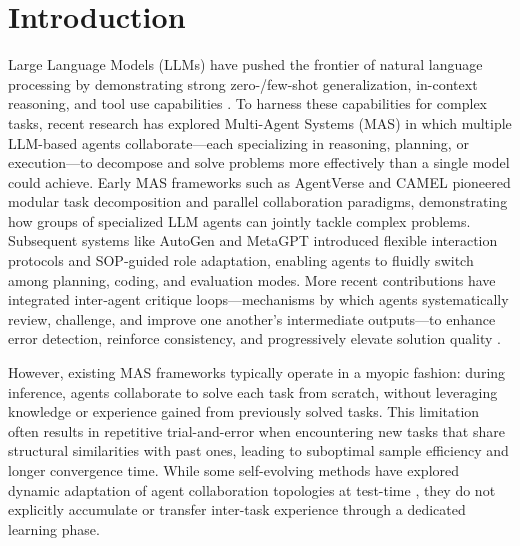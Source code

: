 \documentclass[preprint]{article}
\begin{document}
\section{Introduction}
Large Language Models (LLMs) have pushed the frontier of natural language processing by demonstrating strong zero-/few-shot generalization, in-context reasoning, and tool use capabilities \citep{vaswani2017attention,radford2019language,qin2023toolllm,schick2023toolformer}. 
To harness these capabilities for complex tasks, recent research has explored Multi-Agent Systems (MAS) in which multiple LLM-based agents collaborate—each specializing in reasoning, planning, or execution—to decompose and solve problems more effectively than a single model could achieve. 
Early MAS frameworks such as AgentVerse \citep{chen2023agentverse} and CAMEL \citep{li2023camel} pioneered modular task decomposition and parallel collaboration paradigms, demonstrating how groups of specialized LLM agents can jointly tackle complex problems. Subsequent systems like AutoGen \citep{wu2023autogen} and MetaGPT \citep{hong2023metagpt} introduced flexible interaction protocols and SOP‑guided role adaptation, enabling agents to fluidly switch among planning, coding, and evaluation modes. More recent contributions have integrated inter‑agent critique loops—mechanisms by which agents systematically review, challenge, and improve one another’s intermediate outputs—to enhance error detection, reinforce consistency, and progressively elevate solution quality \citep{park2023generative, liu2024dynamic}.

However, existing MAS frameworks typically operate in a myopic fashion: during inference, agents collaborate to solve each task from scratch, without leveraging knowledge or experience gained from previously solved tasks. This limitation often results in repetitive trial-and-error when encountering new tasks that share structural similarities with past ones, leading to suboptimal sample efficiency and longer convergence time. While some self-evolving methods have explored dynamic adaptation of agent collaboration topologies at test-time \citep{hu2025selfevolving,zhang2025evoflow}, they do not explicitly accumulate or transfer inter-task experience through a dedicated learning phase.
\end{document}
